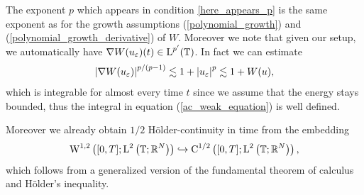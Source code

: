 \begin{remark}
	The exponent $ p $ which appears in condition \ref{here_appears_p} is the 
	same 
	exponent as for the growth assumptions (\ref{polynomial_growth}) and 
	(\ref{polynomial_growth_derivative}) of $ W $.
	Moreover we note that given our setup, we automatically have $ \nabla W ( 
	u_{ \varepsilon } ) ( t ) \in \operatorname{L}^{ p' } ( \operatorname{\mathbb{T}} ) $. In fact we can 
	estimate
	\begin{equation}
		\abs{ \nabla W ( u_{ \varepsilon} ) }^{ p/(p-1) }
		\lesssim
		1+ \abs{u_{ \varepsilon }}^{ p }
		\lesssim
		1 + W ( u ),
	\end{equation}
	which is integrable for almost every time $ t $ since we assume that the energy stays bounded,
	thus the integral in equation (\ref{ac_weak_equation}) is well defined.
	
	Moreover we already obtain $ 1/2 $ Hölder-continuity in time from the embedding
	\begin{equation}
		\label{w12_embeds_into_c1half}
		\operatorname{W}^{ 1 , 2} \left( [ 0 , T ] ; \operatorname{L}^{ 2 } \left( \operatorname{\mathbb{T}};\mathbb{ R 
		}^{ N } \right) \right)
		\hookrightarrow
		\operatorname{C}^{ 1/2 } \left( [ 0 , T ] ; \operatorname{L}^{ 2 } \left( \operatorname{\mathbb{T}} ; \mathbb{ 
		R 
		}^{ N } \right) \right),
	\end{equation}
	which follows from a generalized version of the fundamental theorem of calculus and Hölder's inequality.
\end{remark}